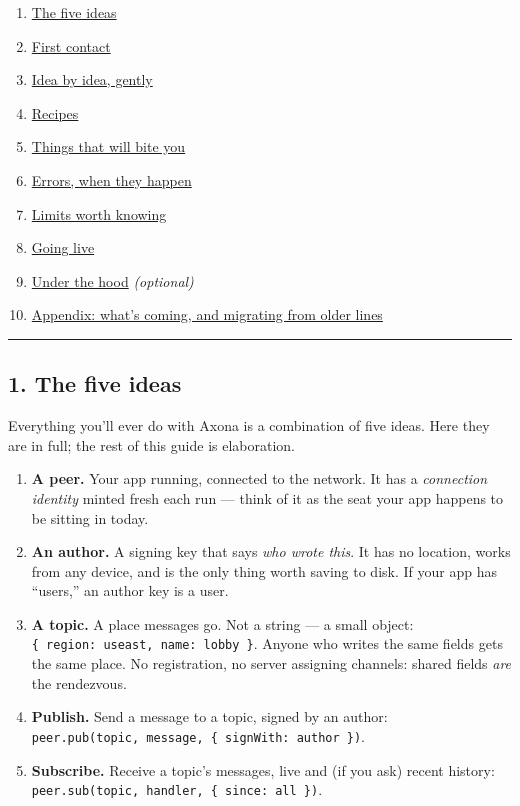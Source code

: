 \documentclass[
  nobib]{tufte-handout}
\providecommand{\tightlist}{%
  \setlength{\itemsep}{0pt}\setlength{\parskip}{0pt}}
\begin{document}
\begin{enumerate}
\def\labelenumi{\arabic{enumi}.}
\tightlist
\item
  \hyperref[1-the-five-ideas]{The five ideas}
\item
  \hyperref[2-first-contact]{First contact}
\item
  \hyperref[3-idea-by-idea-gently]{Idea by idea, gently}
\item
  \hyperref[4-recipes]{Recipes}
\item
  \hyperref[5-things-that-will-bite-you]{Things that will bite you}
\item
  \hyperref[6-errors-when-they-happen]{Errors, when they happen}
\item
  \hyperref[7-limits-worth-knowing]{Limits worth knowing}
\item
  \hyperref[8-going-live]{Going live}
\item
  \hyperref[9-under-the-hood--optional]{Under the hood}
  \emph{(optional)}
\item
  \hyperref[10-appendix]{Appendix: what's coming, and migrating from
  older lines}
\end{enumerate}

\begin{center}\rule{0.5\linewidth}{0.5pt}\end{center}

\subsection{1. The five ideas}\label{the-five-ideas}

Everything you'll ever do with Axona is a combination of five ideas.
Here they are in full; the rest of this guide is elaboration.

\begin{enumerate}
\def\labelenumi{\arabic{enumi}.}
\item
  \textbf{A peer.} Your app running, connected to the network. It has a
  \emph{connection identity} minted fresh each run --- think of it as
  the seat your app happens to be sitting in today.
\item
  \textbf{An author.} A signing key that says \emph{who wrote this}. It
  has no location, works from any device, and is the only thing worth
  saving to disk. If your app has ``users,'' an author key is a user.
\item
  \textbf{A topic.} A place messages go. Not a string --- a small
  object:
  \texttt{\{\ region:\ \textquotesingle{}useast\textquotesingle{},\ name:\ \textquotesingle{}lobby\textquotesingle{}\ \}}.
  Anyone who writes the same fields gets the same place. No
  registration, no server assigning channels: shared fields \emph{are}
  the rendezvous.
\item
  \textbf{Publish.} Send a message to a topic, signed by an author:
  \texttt{peer.pub(topic,\ message,\ \{\ signWith:\ author\ \})}.
\item
  \textbf{Subscribe.} Receive a topic's messages, live and (if you ask)
  recent history:
  \texttt{peer.sub(topic,\ handler,\ \{\ since:\ \textquotesingle{}all\textquotesingle{}\ \})}.
\end{enumerate}
\end{document}
